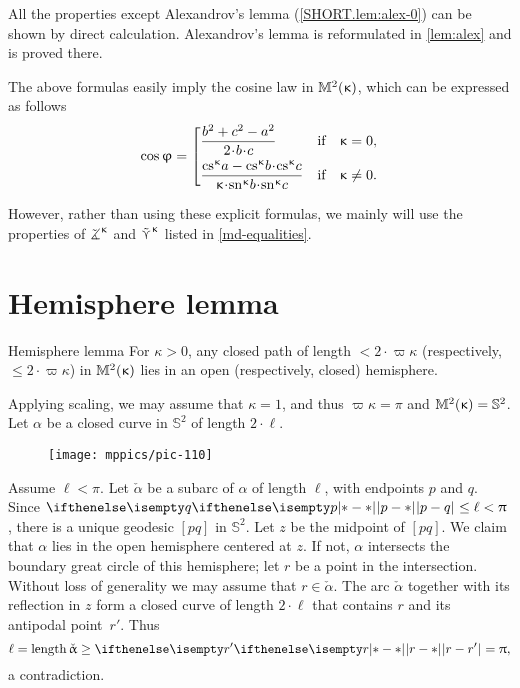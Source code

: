 All the properties except Alexandrov's lemma (\ref{SHORT.lem:alex-0}) can be shown by direct calculation. Alexandrov's lemma is reformulated in \ref{lem:alex} and is proved there.




The above formulas easily imply  the cosine law in $\mathbb{M}_{{}}^{2}({\upkappa})$, which can be expressed as follows
\[\cos\phi
=\left[\begin{aligned}
&\frac{b^2+c^2-a^2}{2\cdot b\cdot c}
&\text{if}&\quad \kappa=0,
\\
&\frac{\cs\kappa a-\cs\kappa b\cdot\cs\kappa c}{\kappa\cdot\sn\kappa b\cdot\sn\kappa c}
&\text{if}&\quad \kappa\not=0.
\end{aligned}\right.\]

However, rather than using these explicit formulas,  we mainly will use
the properties of $\tangle\mc\kappa$ and $\mathop{\tilde\curlyvee}\nolimits^{\upkappa}$ listed in \ref{md-equalities}.

\section{Hemisphere lemma}\label{curves-in-model}

\begin{thm}{Hemisphere lemma}
\label{lem:hemisphere}
For $\kappa>0$, any closed path of length $<2\cdot \varpi\kappa$ (respectively, $\le2\cdot \varpi\kappa$) in $\mathbb{M}_{{}}^{2}({\upkappa})$ lies in an open (respectively, closed) hemisphere. 
\end{thm}

Applying scaling, we may assume that $\kappa=1$, and thus $\varpi\kappa=\pi$ and $\mathbb{M}_{{}}^{2}({\upkappa})=\mathbb{S}^2$.
Let $\alpha$ be a closed curve in $\mathbb{S}^2$ of length $2\cdot\ell$.



\begin{wrapfigure}{o}{35 mm}
\vskip-0mm
\centering
\texttt{[image: mppics/pic-110]}
\end{wrapfigure}

Assume $\ell<\pi$.
Let $\check\alpha$ be a subarc of $\alpha$ of length $\ell$, with endpoints $p$ and $q$. 
Since $\dist{p}{q}{}\le\ell<\pi$, there is a unique geodesic $[pq]$ in $\mathbb{S}^2$.  
Let $z$ be the midpoint of  $[pq]$.  
We claim that $\alpha$ lies in the open hemisphere centered at $z$.  
If not, $\alpha$ intersects the boundary  great circle of this hemisphere; let $r$ be a point in the intersection.
Without loss of generality we may assume that $r\in\check\alpha$. 
The arc $\check\alpha$ together with its reflection in $z$ form a closed curve of length $2\cdot \ell$ that contains $r$ and its antipodal point~$r'$.
Thus 
\[\ell=\length \check\alpha\ge \dist{r}{r'}{}=\pi,\] 
a contradiction.

